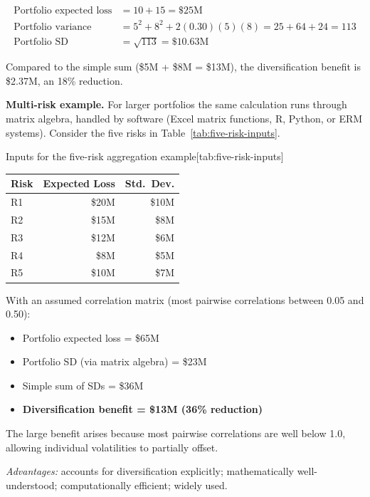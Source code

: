 \documentclass[11pt,openany]{book}
\providecommand{\tightlist}{\setlength{\itemsep}{0pt}\setlength{\parskip}{0pt}}
\begin{document}
\begin{align*}
\text{Portfolio expected loss} &= 10 + 15 = \$25\text{M} \\
\text{Portfolio variance} &= 5^2 + 8^2 + 2(0.30)(5)(8) = 25 + 64 + 24 = 113 \\
\text{Portfolio SD} &= \sqrt{113} = \$10.63\text{M}
\end{align*}

Compared to the simple sum (\$5M + \$8M = \$13M), the diversification benefit
is \$2.37M, an 18\% reduction.

\textbf{Multi-risk example.} For larger portfolios the same calculation runs
through matrix algebra, handled by software (Excel matrix functions, R,
Python, or ERM systems). Consider the five risks in
Table~\ref{tab:five-risk-inputs}.

\begin{ermtable}{Inputs for the five-risk aggregation example}[tab:five-risk-inputs]
\begin{tabular}{@{}lrr@{}}
\toprule
\textbf{Risk} & \textbf{Expected Loss} & \textbf{Std.\ Dev.} \\
\midrule
R1 & \$20M & \$10M \\
R2 & \$15M & \$8M \\
R3 & \$12M & \$6M \\
R4 & \$8M  & \$5M \\
R5 & \$10M & \$7M \\
\bottomrule
\end{tabular}
\end{ermtable}

With an assumed correlation matrix (most pairwise correlations between 0.05
and 0.50):

\begin{itemize}\tightlist
  \item Portfolio expected loss = \$65M
  \item Portfolio SD (via matrix algebra) = \$23M
  \item Simple sum of SDs = \$36M
  \item \textbf{Diversification benefit = \$13M (36\% reduction)}
\end{itemize}

The large benefit arises because most pairwise correlations are well below
1.0, allowing individual volatilities to partially offset.

\emph{Advantages:} accounts for diversification explicitly; mathematically
well-understood; computationally efficient; widely used.
\end{document}
